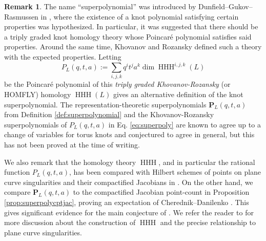 \documentclass{amsart}
\numberwithin{equation}{section}
\theoremstyle{definition}
\newtheorem{remark}[lemma]{Remark}%
\DeclareMathOperator{\HHH}{\mathrm{HHH}}
\begin{document}
\begin{remark}
The name ``superpolynomial'' was introduced by Dunfield--Gukov--Rasmussen in \cite{DGR}, where the existence of a knot polynomial satisfying certain properties was hypothesized. In particular, it was suggested that there should be a triply graded knot homology theory whose Poincar\'e polynomial satisfies said properties. Around the same time, Khovanov and Rozansky \cite{Khovanov} defined such a theory with the expected properties. Letting
\begin{equation}
\label{eq:superpoly}
P_L(q,t,a):=\sum_{i,j,k}q^it^ja^k\dim \HHH^{i,j,k}(L)
\end{equation}
be the Poincar\'e polynomial of this {\em triply graded Khovanov-Rozansky} (or HOMFLY) homology $\HHH(L)$ gives an alternative definition of the knot superpolynomial. The representation-theoretic superpolynomials $\mathbf{P}_L(q,t,a)$ from Definition \ref{def:superpolynomial} and the Khovanov-Rozansky superpolynomials of $P_L(q,t,a)$ in Eq. \eqref{eq:superpoly} are known to agree up to a change of variables for torus knots \cite{Mel,EH,HM} and conjectured to agree in general, but this has not been proved at the time of writing.%

We also remark that the homology theory $\HHH$, and in particular the rational function $P_L(q,t,a)$, has been compared with Hilbert schemes of points on plane curve singularities and their compactified Jacobians in \cite{ORS}. On the other hand, we compare $\mathbf{P}_L(q,t,a)$ to the compactified Jacobian point-count in Proposition \ref{prop:superpolycptjac}, proving an expectation of Cherednik--Danilenko \cite{CD}. This gives significant evidence for the main conjecture of \cite{ORS}. We refer the reader to \cite{GKR} for more discussion about the construction of $\HHH$ and the precise relationship to plane curve singularities. 
\end{remark}


\end{document}
